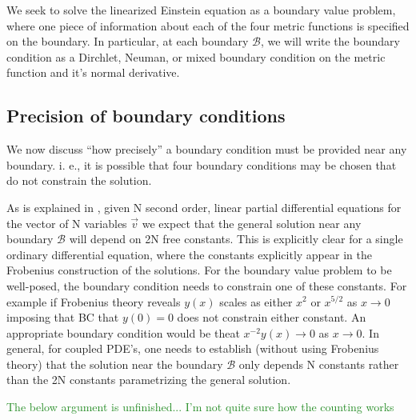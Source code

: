 \documentclass[aps,prd,amsmath,showpacs,amssymb,superscriptaddress,nofootinbib,longbibliography,eqsecnum,preprintnumbers]{revtex4-1}
\newcommand{\zach}[1]{\textcolor{ForestGreen}{#1}}
\begin{document}

We seek to solve the linearized Einstein equation as a boundary value problem, where one piece of information about each of the four metric functions is specified on the boundary. In particular, at each boundary $\mathcal{B}$, we will write the boundary condition as a Dirchlet, Neuman, or mixed boundary condition on the metric function and it's normal derivative.

\subsection{Precision of boundary conditions}

\label{sec:prec}

We now discuss ``how precisely'' a boundary condition must be provided near any boundary. i. e., it is possible that four boundary conditions may be chosen that do not constrain the solution.

As is explained in \cite{Dias:2015nua}, given N second order, linear partial differential equations for the vector of N variables $\vec v$ we expect that the general solution near any boundary $\mathcal{B}$ will depend on 2N free constants. This is explicitly clear for a single ordinary differential equation, where the constants explicitly appear in the Frobenius construction of the solutions. For the boundary value problem to be well-posed, the boundary condition needs to constrain one of these constants. For example if Frobenius theory reveals $y(x)$ scales as either $x^2$ or $x^{5/2}$ as $x\to 0$ imposing that BC that $y(0)=0$ does not constrain either constant. An appropriate boundary condition would be theat $x^{-2}y(x)\to0$ as $x\to 0$. In general, for coupled PDE's, one needs to establish (without using Frobenius theory) that the solution near the boundary $\mathcal{B}$ only depends N constants rather than the 2N constants parametrizing the general solution.

\zach{The below argument is unfinished... I'm not quite sure how the counting works}
\end{document}
